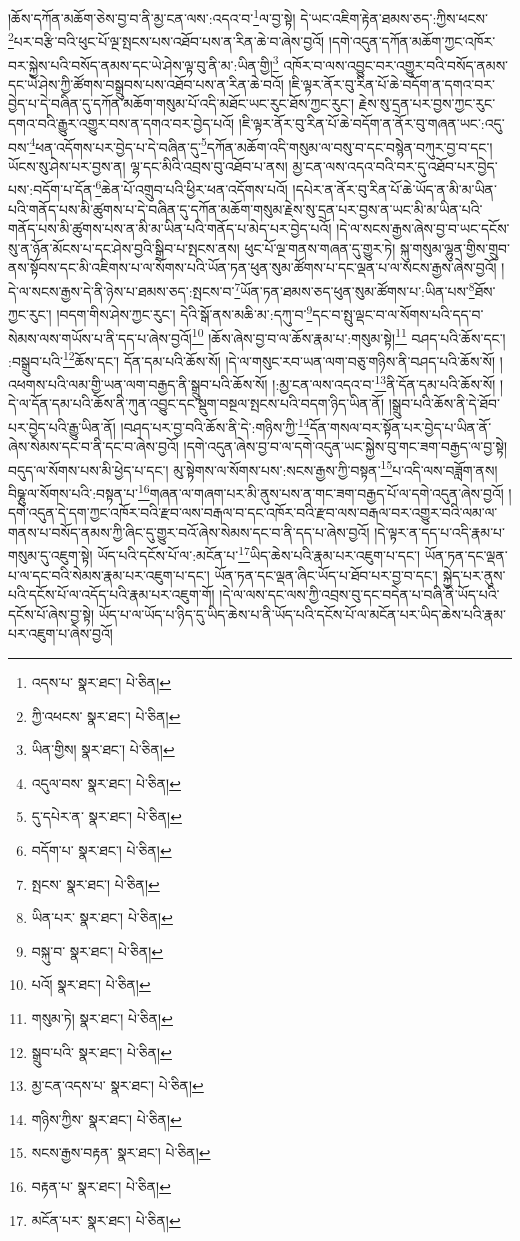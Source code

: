 །ཆོས་དཀོན་མཆོག་ཅེས་བྱ་བ་ནི་མྱ་ངན་ལས་:འདའ་བ་\footnote{འདས་པ་  སྣར་ཐང་།  པེ་ཅིན། }ལ་བྱ་སྟེ། དེ་ཡང་འཇིག་རྟེན་ཐམས་ཅད་:ཀྱིས་ཕངས་\footnote{ཀྱི་འཕངས་  སྣར་ཐང་།  པེ་ཅིན། }པར་བརྩི་བའི་ཕུང་པོ་ལྔ་སྤངས་པས་འཐོབ་པས་ན་རིན་ཆེ་བ་ཞེས་བྱའོ། །དགེ་འདུན་དཀོན་མཆོག་ཀྱང་འཁོར་བར་སྐྱེས་པའི་བསོད་ནམས་དང་ཡེ་ཤེས་ལྟ་བུ་ནི་མ་:ཡིན་གྱི།\footnote{ཡིན་གྱིས།  སྣར་ཐང་།  པེ་ཅིན། } འཁོར་བ་ལས་འབྱུང་བར་འགྱུར་བའི་བསོད་ནམས་དང་ཡེ་ཤེས་ཀྱི་ཚོགས་བསྒྲུབས་པས་འཐོབ་པས་ན་རིན་ཆེ་བའོ། །ཇི་ལྟར་ནོར་བུ་རིན་པོ་ཆེ་བདོག་ན་དགའ་བར་བྱེད་པ་དེ་བཞིན་དུ་དཀོན་མཆོག་གསུམ་པོ་འདི་མཐོང་ཡང་རུང་ཐོས་ཀྱང་རུང་། རྗེས་སུ་དྲན་པར་བྱས་ཀྱང་རུང་དགའ་བའི་རྒྱུར་འགྱུར་བས་ན་དགའ་བར་བྱེད་པའོ། །ཇི་ལྟར་ནོར་བུ་རིན་པོ་ཆེ་བདོག་ན་ནོར་བུ་གཞན་ཡང་:འདུ་བས་\footnote{འདུལ་བས་  སྣར་ཐང་།  པེ་ཅིན། }ཕན་འདོགས་པར་བྱེད་པ་དེ་བཞིན་དུ་\footnote{དུ་དཔེར་ན་  སྣར་ཐང་།  པེ་ཅིན། }དཀོན་མཆོག་འདི་གསུམ་ལ་བསུ་བ་དང་བསྙེན་བཀུར་བྱ་བ་དང་། ཡོངས་སུ་ཤེས་པར་བྱས་ན། ལྷ་དང་མིའི་འབྲས་བུ་འཐོབ་པ་ནས། མྱ་ངན་ལས་འདའ་བའི་བར་དུ་འཐོབ་པར་བྱེད་པས་:བདོག་པ་དོན་\footnote{བདོག་པ་  སྣར་ཐང་།  པེ་ཅིན། }ཆེན་པོ་འགྲུབ་པའི་ཕྱིར་ཕན་འདོགས་པའོ། །དཔེར་ན་ནོར་བུ་རིན་པོ་ཆེ་ཡོད་ན་མི་མ་ཡིན་པའི་གནོད་པས་མི་ཚུགས་པ་དེ་བཞིན་དུ་དཀོན་མཆོག་གསུམ་རྗེས་སུ་དྲན་པར་བྱས་ན་ཡང་མི་མ་ཡིན་པའི་གནོད་པས་མི་ཚུགས་པས་ན་མི་མ་ཡིན་པའི་གནོད་པ་མེད་པར་བྱེད་པའོ། །དེ་ལ་སངས་རྒྱས་ཞེས་བྱ་བ་ཡང་དངོས་སུ་ན་ཉོན་མོངས་པ་དང་ཤེས་བྱའི་སྒྲིབ་པ་སྤངས་ནས། ཕུང་པོ་ལྔ་གནས་གཞན་དུ་གྱུར་ཏེ། སྐུ་གསུམ་ལྷུན་གྱིས་གྲུབ་ནས་སྟོབས་དང་མི་འཇིགས་པ་ལ་སོགས་པའི་ཡོན་ཏན་ཕུན་སུམ་ཚོགས་པ་དང་ལྡན་པ་ལ་སངས་རྒྱས་ཞེས་བྱའོ། །དེ་ལ་སངས་རྒྱས་དེ་ནི་ཉེས་པ་ཐམས་ཅད་:སྤངས་བ་\footnote{སྤངས་  སྣར་ཐང་།  པེ་ཅིན། }ཡོན་ཏན་ཐམས་ཅད་ཕུན་སུམ་ཚོགས་པ་:ཡིན་པས་\footnote{ཡིན་པར་  སྣར་ཐང་།  པེ་ཅིན། }ཐོས་ཀྱང་རུང་། །བདག་གིས་ཤེས་ཀྱང་རུང་། དེའི་སྒོ་ནས་མཆི་མ་:དཀུ་བ་\footnote{བསྐུ་བ་  སྣར་ཐང་།  པེ་ཅིན། }དང་བ་སྤུ་ལྡང་བ་ལ་སོགས་པའི་དད་བ་སེམས་ལས་གཡོས་པ་ནི་དད་པ་ཞེས་བྱའོ།\footnote{པའོ།  སྣར་ཐང་།  པེ་ཅིན། } །ཆོས་ཞེས་བྱ་བ་ལ་ཆོས་རྣམ་པ་:གསུམ་སྟེ།\footnote{གསུམ་ཏེ།  སྣར་ཐང་།  པེ་ཅིན། } བཤད་པའི་ཆོས་དང་། :བསྒྲུབ་པའི་\footnote{སྒྲུབ་པའི་  སྣར་ཐང་།  པེ་ཅིན། }ཆོས་དང་། དོན་དམ་པའི་ཆོས་སོ། །དེ་ལ་གསུང་རབ་ཡན་ལག་བཅུ་གཉིས་ནི་བཤད་པའི་ཆོས་སོ། །འཕགས་པའི་ལམ་གྱི་ཡན་ལག་བརྒྱད་ནི་སྒྲུབ་པའི་ཆོས་སོ། །:མྱ་ངན་ལས་འདའ་བ་\footnote{མྱ་ངན་འདས་པ་  སྣར་ཐང་།  པེ་ཅིན། }ནི་དོན་དམ་པའི་ཆོས་སོ། །དེ་ལ་དོན་དམ་པའི་ཆོས་ནི་ཀུན་འབྱུང་དང་སྡུག་བསྔལ་སྤངས་པའི་བདག་ཉིད་ཡིན་ནོ། །སྒྲུབ་པའི་ཆོས་ནི་དེ་ཐོབ་པར་བྱེད་པའི་རྒྱུ་ཡིན་ནོ། །བཤད་པར་བྱ་བའི་ཆོས་ནི་དེ་:གཉིས་ཀྱི་\footnote{གཉིས་ཀྱིས་  སྣར་ཐང་།  པེ་ཅིན། }དོན་གསལ་བར་སྟོན་པར་བྱེད་པ་ཡིན་ནོ་ཞེས་སེམས་དང་བ་ནི་དང་བ་ཞེས་བྱའོ། །དགེ་འདུན་ཞེས་བྱ་བ་ལ་དགེ་འདུན་ཡང་སྐྱེས་བུ་གང་ཟག་བརྒྱད་ལ་བྱ་སྟེ། བདུད་ལ་སོགས་པས་མི་ཕྱེད་པ་དང་། མུ་སྟེགས་ལ་སོགས་པས་:སངས་རྒྱས་ཀྱི་བསྟན་\footnote{སངས་རྒྱས་བརྟན་  སྣར་ཐང་།  པེ་ཅིན། }པ་འདི་ལས་བཟློག་ནས། བིཥྞུ་ལ་སོགས་པའི་:བསྟན་པ་\footnote{བརྟན་པ་  སྣར་ཐང་།  པེ་ཅིན། }གཞན་ལ་གཞག་པར་མི་ནུས་པས་ན་གང་ཟག་བརྒྱད་པོ་ལ་དགེ་འདུན་ཞེས་བྱའོ། །དགེ་འདུན་དེ་དག་ཀྱང་འཁོར་བའི་རྫབ་ལས་བརྒལ་བ་དང་འཁོར་བའི་རྫབ་ལས་བརྒལ་བར་འགྱུར་བའི་ལམ་ལ་གནས་པ་བསོད་ནམས་ཀྱི་ཞིང་དུ་གྱུར་བའོ་ཞེས་སེམས་དང་བ་ནི་དད་པ་ཞེས་བྱའོ། །དེ་ལྟར་ན་དད་པ་འདི་རྣམ་པ་གསུམ་དུ་འཇུག་སྟེ། ཡོད་པའི་དངོས་པོ་ལ་:མངོན་པ་\footnote{མངོན་པར་  སྣར་ཐང་།  པེ་ཅིན། }ཡིད་ཆེས་པའི་རྣམ་པར་འཇུག་པ་དང་། ཡོན་ཏན་དང་ལྡན་པ་ལ་དང་བའི་སེམས་རྣམ་པར་འཇུག་པ་དང་། ཡོན་ཏན་དང་ལྡན་ཞིང་ཡོད་པ་ཐོབ་པར་བྱ་བ་དང་། སྐྱེད་པར་ནུས་པའི་དངོས་པོ་ལ་འདོད་པའི་རྣམ་པར་འཇུག་གོ། །དེ་ལ་ལས་དང་ལས་ཀྱི་འབྲས་བུ་དང་བདེན་པ་བཞི་ནི་ཡོད་པའི་དངོས་པོ་ཞེས་བྱ་སྟེ། ཡོད་པ་ལ་ཡོད་པ་ཉིད་དུ་ཡིད་ཆེས་པ་ནི་ཡོད་པའི་དངོས་པོ་ལ་མངོན་པར་ཡིད་ཆེས་པའི་རྣམ་པར་འཇུག་པ་ཞེས་བྱའོ། 